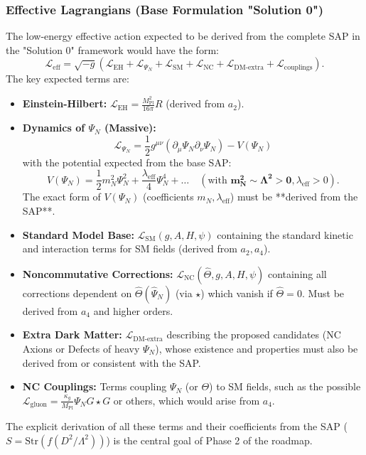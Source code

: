 \documentclass[11pt, a4paper]{article}
\theoremstyle{remark}
\newcommand{\Op}[1]{\hat{#1}}
\newcommand{\Str}{\mathrm{Str}}
\newcommand{\Mpl}{M_{\mathrm{Pl}}}
\begin{document}
\subsubsection{Effective Lagrangians (Base Formulation "Solution 0")}
\label{ssubsec:full_lagrangians_final_revised}
The low-energy effective action expected to be derived from the complete SAP in the "Solution 0" framework would have the form:
\[ \mathcal{L}_{\text{eff}} = \sqrt{-g} \left( \mathcal{L}_{\text{EH}} + \mathcal{L}_{\Psi_N} + \mathcal{L}_{\text{SM}} + \mathcal{L}_{\text{NC}} + \mathcal{L}_{\text{DM-extra}} + \mathcal{L}_{\text{couplings}} \right). \]
The key expected terms are:
\begin{itemize}
    \item \textbf{Einstein-Hilbert:} \( \mathcal{L}_{\text{EH}} = \frac{\Mpl^2}{16\pi} R \) (derived from \(a_2\)).
    \item \textbf{Dynamics of \( \Psi_N \) (Massive):}
          \begin{equation} \label{eq:L_PsiN_explicit_final_redux}
          \mathcal{L}_{\Psi_N} = \frac{1}{2} g^{\mu\nu} (\partial_\mu \Psi_N \partial_\nu \Psi_N) - V(\Psi_N)
          \end{equation}
          with the potential expected from the base SAP:
          \begin{equation}\label{eq:potencial_psi_n_final_redux}
          V(\Psi_N) = \frac{1}{2} m_N^2 \Psi_N^2 + \frac{\lambda_{\text{eff}}}{4} \Psi_N^4 + \dots \quad (\text{with } \mathbf{m_N^2 \sim \Lambda^2 > 0} , \lambda_{\text{eff}} > 0).
          \end{equation}
          The exact form of \( V(\Psi_N) \) (coefficients \( m_N, \lambda_{\text{eff}} \)) must be **derived from the SAP**.
    \item \textbf{Standard Model Base:} \( \mathcal{L}_{\text{SM}}(g, A, H, \psi) \) containing the standard kinetic and interaction terms for SM fields (derived from \(a_2, a_4\)).
    \item \textbf{Noncommutative Corrections:} \( \mathcal{L}_{\text{NC}}(\Op{\Theta}, g, A, H, \psi) \) containing all corrections dependent on \( \Op{\Theta}(\Op{\Psi}_N) \) (via \( \star \)) which vanish if \( \Op{\Theta} = 0 \). Must be derived from \(a_4\) and higher orders.
    \item \textbf{Extra Dark Matter:} \( \mathcal{L}_{\text{DM-extra}} \) describing the proposed candidates (NC Axions or Defects of heavy \( \Psi_N \)), whose existence and properties must also be derived from or consistent with the SAP.
    \item \textbf{NC Couplings:} Terms coupling \( \Psi_N \) (or \( \Theta \)) to SM fields, such as the possible \( \mathcal{L}_{\text{gluon}} = \frac{\kappa_g}{\Mpl} \Psi_N G \star G \) or others, which would arise from \( a_4 \).
\end{itemize}
The explicit derivation of all these terms and their coefficients from the SAP (\( S = \Str(f(D^2/\Lambda^2)) \)) is the central goal of Phase 2 of the roadmap.
\end{document}
